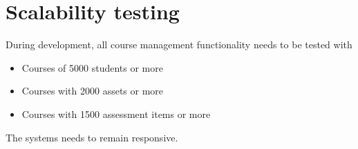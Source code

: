 \section{Scalability testing}
During development, all course management functionality needs to be tested with
\begin{itemize}
\item Courses of 5000 students or more
\item Courses with 2000 assets or more
\item Courses with 1500 assessment items or more
\end{itemize}
The systems needs to remain responsive.
